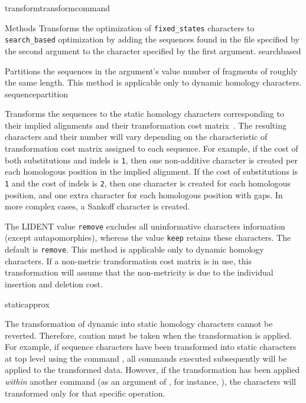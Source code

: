 \begin{command}{transform}{transformcommand}
\begin{arguments}
\begin{argumentgroup}{Methods}
        {Transforms the optimization of \texttt{fixed\_states} characters to \texttt{search\_based}
        optimization \cite{wheeler2003b} by adding the sequences found in the file specified by the second argument to the character specified by the 
        first argument.}
        {searchbased}
            
            {Partitions the sequences in the argument's value number of
            fragments of roughly the same length. This method is applicable only to dynamic homology characters.}
            {sequencepartition}

            {Transforms the sequences to the static homology characters
            corresponding to their implied alignments and their transformation
            cost matrix~\cite{wheeler2003}. The resulting characters and their number will vary
            depending on the characteristic of transformation cost matrix
            assigned to each sequence. For example, if the cost of both substitutions
            and indels is \texttt{1}, then one non-additive character is created per
            each homologous position in the implied alignment. If the cost of
            substitutions is \texttt{1} and the cost of indels  is \texttt{2}, then
            one character is created for each homologous position, and one extra character for
            each homologous position with gaps. In more complex cases, a Sankoff character is
            created.
            
            The LIDENT value \texttt{remove} excludes all uninformative characters
            information (except autapomorphies), whereas the value \texttt{keep}
            retains these characters. The default is \texttt{remove}. This
            method is applicable only to dynamic homology characters. If
            a non-metric transformation cost matrix is in use, this
            transformation will assume that the non-metricity is due to the
            individual insertion and deletion cost.}
            {staticapprox}
            
            \begin{statement}
  	  The transformation of dynamic into static homology characters cannot be reverted.
	  Therefore, caution must be taken when the transformation is applied. For example,
	  if sequence characters have been transformed into static characters at top level using
	  the command , all commands executed 
	  subsequently will be applied to the transformed data. However, if the transformation has 
	  been applied \emph{within} another command (as an argument of , 
	  for instance, ), the characters will transformed only for that specific operation.
	   \end{statement}
	

\end{argumentgroup}
\end{arguments}
\end{command}
